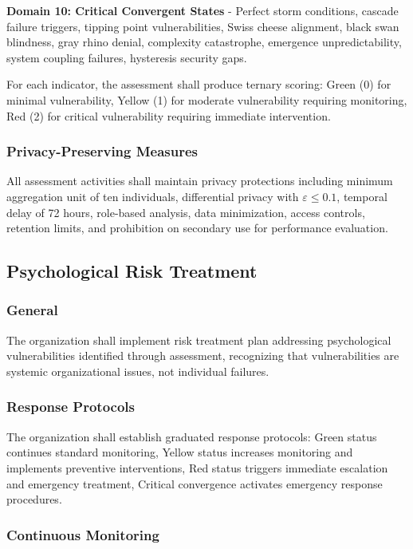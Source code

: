 \documentclass[11pt,a4paper]{article}
\begin{document}
\textbf{Domain 10: Critical Convergent States} - Perfect storm conditions, cascade failure triggers, tipping point vulnerabilities, Swiss cheese alignment, black swan blindness, gray rhino denial, complexity catastrophe, emergence unpredictability, system coupling failures, hysteresis security gaps.

For each indicator, the assessment shall produce ternary scoring: Green (0) for minimal vulnerability, Yellow (1) for moderate vulnerability requiring monitoring, Red (2) for critical vulnerability requiring immediate intervention.

\subsubsection{Privacy-Preserving Measures}

All assessment activities shall maintain privacy protections including minimum aggregation unit of ten individuals, differential privacy with $\varepsilon \leq 0.1$, temporal delay of 72 hours, role-based analysis, data minimization, access controls, retention limits, and prohibition on secondary use for performance evaluation.

\subsection{Psychological Risk Treatment}

\subsubsection{General}

The organization shall implement risk treatment plan addressing psychological vulnerabilities identified through assessment, recognizing that vulnerabilities are systemic organizational issues, not individual failures.

\subsubsection{Response Protocols}

The organization shall establish graduated response protocols: Green status continues standard monitoring, Yellow status increases monitoring and implements preventive interventions, Red status triggers immediate escalation and emergency treatment, Critical convergence activates emergency response procedures.

\subsubsection{Continuous Monitoring}
\end{document}
